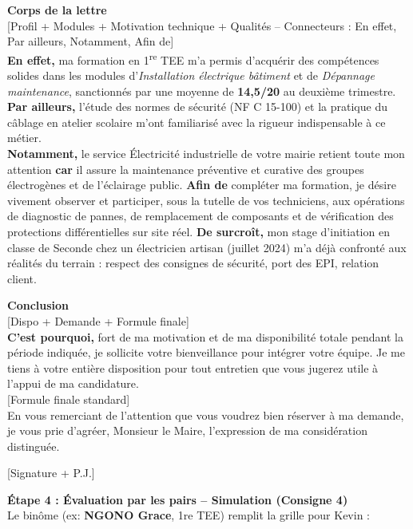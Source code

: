 \documentclass[11pt]{article}
\begin{document}
\begin{exoresolu}
\medskip
\noindent \textbf{Corps de la lettre} \\
\textcolor{popmuted}{[Profil + Modules + Motivation technique + Qualités -- Connecteurs : En effet, Par ailleurs, Notamment, Afin de]} \\
\textbf{En effet,} ma formation en 1\textsuperscript{re} TEE m'a permis d'acquérir des compétences solides dans les modules d'\emph{Installation électrique bâtiment} et de \emph{Dépannage maintenance}, sanctionnés par une moyenne de \textbf{14,5/20} au deuxième trimestre. \textbf{Par ailleurs,} l'étude des normes de sécurité (NF C 15-100) et la pratique du câblage en atelier scolaire m'ont familiarisé avec la rigueur indispensable à ce métier. \\
\textbf{Notamment,} le service Électricité industrielle de votre mairie retient toute mon attention \textbf{car} il assure la maintenance préventive et curative des groupes électrogènes et de l'éclairage public. \textbf{Afin de} compléter ma formation, je désire vivement observer et participer, sous la tutelle de vos techniciens, aux opérations de diagnostic de pannes, de remplacement de composants et de vérification des protections différentielles sur site réel. \textbf{De surcroît,} mon stage d'initiation en classe de Seconde chez un électricien artisan (juillet 2024) m'a déjà confronté aux réalités du terrain : respect des consignes de sécurité, port des EPI, relation client.

\medskip
\noindent \textbf{Conclusion} \\
\textcolor{popmuted}{[Dispo + Demande + Formule finale]} \\
\textbf{C'est pourquoi,} fort de ma motivation et de ma disponibilité totale pendant la période indiquée, je sollicite votre bienveillance pour intégrer votre équipe. Je me tiens à votre entière disposition pour tout entretien que vous jugerez utile à l'appui de ma candidature. \\
\textcolor{popmuted}{[Formule finale standard]} \\
En vous remerciant de l'attention que vous voudrez bien réserver à ma demande, je vous prie d'agréer, Monsieur le Maire, l'expression de ma considération distinguée.

\medskip
\noindent \textcolor{popmuted}{[Signature + P.J.]}

\textbf{Étape 4 : Évaluation par les pairs -- Simulation (Consigne 4)} \\
\noindent Le binôme (ex: \textbf{NGONO Grace}, 1re TEE) remplit la grille pour Kevin :


\end{exoresolu}
\end{document}
